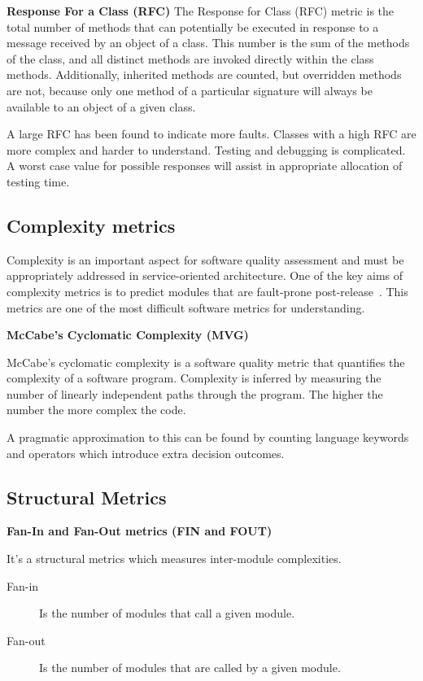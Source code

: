 \textbf{Response For a Class (RFC)} 
The Response for Class (RFC) metric is the total number of methods that can potentially be executed in response to a message received by an object of a class. This number is the sum of the methods of the class, and all distinct methods are invoked directly within the class methods. Additionally, inherited
methods are counted, but overridden methods are not, because only one method of a particular signature will always be available to an object of a given class.

A large RFC has been found to indicate more faults. Classes with a high RFC are more complex and harder to understand. Testing and debugging is complicated. A worst case value for possible responses will assist in appropriate allocation of testing time.
\subsection{Complexity metrics}
Complexity is an important aspect for software quality assessment and must be appropriately addressed in service-oriented architecture\cite{complexity}. One  of  the  key  aims  of  complexity  metrics  is  to  predict modules   that are fault-prone post-release~\cite{complexity2}. This metrics are one of the most difficult software metrics for understanding.

\textbf{McCabe's Cyclomatic Complexity (MVG)}

McCabe's cyclomatic complexity is a software quality metric that quantifies the complexity of a software program. Complexity is inferred by measuring the number of linearly independent paths through the program. The higher the number the more complex the code.

A pragmatic approximation to this can be found by counting language keywords and operators which introduce extra decision outcomes.
\subsection{Structural Metrics}

\textbf{Fan-In and Fan-Out metrics (FIN and FOUT)}

It's a structural metrics which measures inter-module complexities. 
\begin{description}
	\item[Fan-in] Is the number of modules that call a given module.
	\item[Fan-out] Is the number of modules that are called by a given module.
\end{description}

